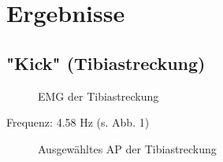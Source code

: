 \section{Ergebnisse}
\subsection{"{}Kick"{} (Tibiastreckung)}
\begin{figure}[H]
\caption{EMG der Tibiastreckung}
\label{kick}
\end{figure}
Frequenz: 4.58 Hz (s. Abb. 1)

\begin{figure}[H]
\caption{Ausgewähltes AP der Tibiastreckung}
\label{kick-ap}
\end{figure}

